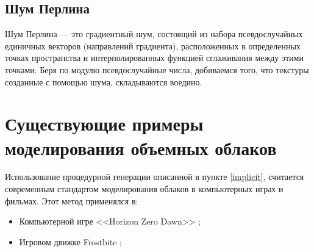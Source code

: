 \subsection{Шум Перлина}

Шум Перлина — это градиентный шум, состоящий из набора псевдослучайных единичных векторов (направлений градиента), расположенных в определенных точках пространства и интерполированных функцией сглаживания между этими точками. Беря по модулю псевдослучайные числа, добиваемся того, что текстуры созданные с помощью шума, складываются воедино. 



\section{Существующие примеры моделирования объемных облаков}
	
	Использование процедурной генерации описанной в пункте \ref{implicit}, считается современным стандартом моделирования облаков в компьютерных играх и фильмах. Этот метод применялся в:
	\begin{itemize}
		\item Компьютерной игре <<Horizon Zero Dawn>> \cite{hzd};
		\item Игровом движке Frostbite \cite{frostbite};
	\end{itemize}
	
	








